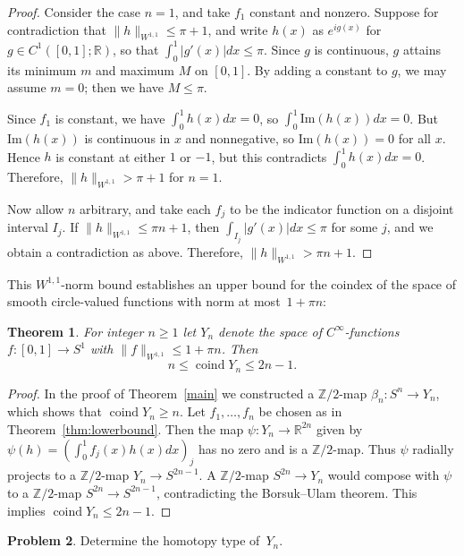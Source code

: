 \documentclass[11pt, reqno, english]{amsart}
\theoremstyle{plain}
\newtheorem{theorem}{Theorem}[section]
\theoremstyle{definition}
\newtheorem{problem}[theorem]{Problem}
\newcommand{\R}{\mathbb{R}}
\newcommand{\Z}{\mathbb{Z}}
\DeclareMathOperator{\coind}{\mathrm{coind}}
\begin{document}
\begin{proof} Consider the case $n = 1$, and take $f_{1}$ constant and nonzero.
  Suppose for contradiction that $\|h\|_{W^{1,1}} \le \pi + 1$, and write
  $h(x)$ as $e^{ig(x)}$ for $g \in C^{1}([0, 1]; \R)$, so that
  $\int_{0}^{1}|g'(x)|dx \le \pi$. Since $g$ is continuous, $g$ attains its
  minimum $m$ and maximum $M$ on $[0, 1]$. By adding a constant to $g$, we may
  assume $m = 0$; then we have $M \le \pi$.

  Since $f_{1}$ is constant, we have $\int_{0}^{1}h(x)dx = 0$, so
  $\int_{0}^{1}\text{Im}(h(x))dx = 0$. But $\text{Im}(h(x))$ is continuous in
  $x$ and nonnegative, so $\text{Im}(h(x)) = 0$ for all $x$. Hence $h$ is
  constant at either $1$ or $-1$, but this contradicts $\int_{0}^{1}h(x)dx =
  0$. Therefore, $\|h\|_{W^{1,1}} > \pi + 1$ for $n = 1$.

  Now allow $n$ arbitrary, and take each $f_{j}$ to be the indicator function
  on a disjoint interval $I_{j}$. If $\|h\|_{W^{1,1}} \le \pi n + 1$, then
  $\int_{I_{j}}|g'(x)|dx \le \pi$ for some $j$, and we obtain a contradiction
  as above. Therefore, $\|h\|_{W^{1,1}} > \pi n + 1$.
\end{proof}

This $W^{1,1}$-norm bound establishes an upper bound for the coindex of the space of
smooth circle-valued functions with norm at most~${1+\pi n}$:

\begin{theorem}
\label{thm:coindex}
	For integer $n \ge 1$ let $Y_n$ denote the space of $C^\infty$-functions $f\colon [0,1] \to S^1$
	with $\|f\|_{W^{1,1}} \le 1+ \pi n$. Then $$n \le \coind Y_n \le 2n-1.$$
\end{theorem}

\begin{proof}
	In the proof of Theorem~\ref{main} we constructed a $\Z/2$-map $\beta_n \colon S^n \to Y_n$,
	which shows that ${\coind Y_n \ge n}$. Let $f_1, \dots, f_n$ be chosen as
	in Theorem~\ref{thm:lowerbound}. Then the map $\psi\colon Y_n \to \R^{2n}$
	given by $\psi(h) = (\int_{0}^{1}f_{j}(x)h(x)dx)_j$ has no zero and is a $\Z/2$-map.
	Thus $\psi$ radially projects to a $\Z/2$-map $Y_n \to S^{2n-1}$. A $\Z/2$-map
	$S^{2n} \to Y_n$ would compose with $\psi$ to a $\Z/2$-map $S^{2n} \to S^{2n-1}$,
	contradicting the Borsuk--Ulam theorem. This implies $\coind Y_n \le 2n-1$.
\end{proof}


\begin{problem}
	Determine the homotopy type of~$Y_n$.
\end{problem}
\end{document}
